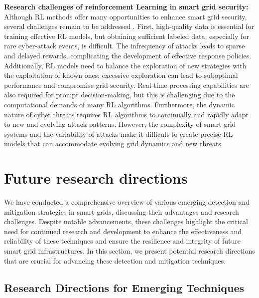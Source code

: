 \documentclass[10pt, journal]{IEEEtran}
\begin{document}
{\bf Research challenges of reinforcement Learning in smart grid security:}
Although RL methods offer many opportunities to enhance smart grid security, several challenges remain to be addressed \cite{wang2024reinforcement, sharif2024smart}. First, high-quality data is essential for training effective RL models, but obtaining sufficient labeled data, especially for rare cyber-attack events, is difficult. The infrequency of attacks leads to sparse and delayed rewards, complicating the development of effective response policies. Additionally, RL models need to balance the exploration of new strategies with the exploitation of known ones; excessive exploration can lead to suboptimal performance and compromise grid security. Real-time processing capabilities are also required for prompt decision-making, but this is challenging due to the computational demands of many RL algorithms. Furthermore, the dynamic nature of cyber threats requires RL algorithms to continually and rapidly adapt to new and evolving attack patterns. However, the complexity of smart grid systems and the variability of attacks make it difficult to create precise RL models that can accommodate evolving grid dynamics and new threats. 
		
\section{Future research directions}
\label{section:future}

We have conducted a comprehensive overview of various emerging detection and mitigation strategies in smart grids, discussing their advantages and research challenges. Despite notable advancements, these challenges highlight the critical need for continued research and development to enhance the effectiveness and reliability of these techniques and ensure the resilience and integrity of future smart grid infrastructures. In this section, we present potential research directions that are crucial for advancing these detection and mitigation techniques. 

\subsection{Research Directions for Emerging Techniques}
\end{document}
